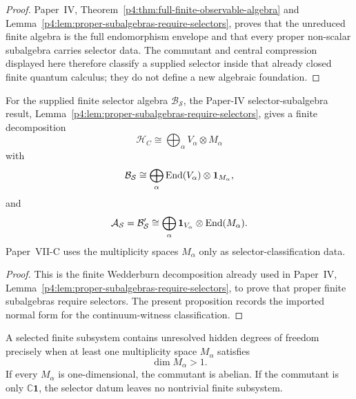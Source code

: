 \documentclass[12pt,a4paper]{article}
\begin{document}
\begin{proof}
Paper~IV, Theorem~\ref{p4:thm:full-finite-observable-algebra} and Lemma~\ref{p4:lem:proper-subalgebras-require-selectors}, proves that the unreduced finite algebra is the full endomorphism
envelope and that every proper non-scalar subalgebra carries selector data.
The commutant and central compression displayed here therefore classify a
supplied selector inside that already closed finite quantum calculus; they do
not define a new algebraic foundation.
\end{proof}

\begin{proposition}
\label{p12:thm:wedderburn-selector-form}
For the supplied finite selector algebra \(\mathcal B_{\mathcal S}\), the
Paper-IV selector-subalgebra result, Lemma~\ref{p4:lem:proper-subalgebras-require-selectors}, gives a finite decomposition
\begin{equation}
\label{p12:eq:wedderburn-carrier-decomposition}
\mathcal H_C\cong\bigoplus_{\alpha}V_\alpha\otimes M_\alpha
\end{equation}
with
\begin{equation}
\label{p12:eq:selector-wedderburn}
\mathcal B_{\mathcal S}\cong
\bigoplus_{\alpha}\operatorname{End}(V_\alpha)\otimes\mathbf1_{M_\alpha},
\end{equation}
and
\begin{equation}
\label{p12:eq:commutant-wedderburn}
\mathcal A_{\mathcal S}=\mathcal B_{\mathcal S}'\cong
\bigoplus_{\alpha}\mathbf1_{V_\alpha}\otimes\operatorname{End}(M_\alpha).
\end{equation}
Paper~VII-C uses the multiplicity spaces \(M_\alpha\) only as selector-classification data.
\end{proposition}

\begin{proof}
This is the finite Wedderburn decomposition already used in Paper~IV, Lemma~\ref{p4:lem:proper-subalgebras-require-selectors}, to prove
that proper finite subalgebras require selectors.  The present proposition
records the imported normal form for the continuum-witness classification.
\end{proof}

\begin{corollary}
\label{p12:cor:hidden-dof-multiplicity}
A selected finite subsystem contains unresolved hidden degrees of freedom precisely when at least one multiplicity space \(M_\alpha\) satisfies
\[
\dim M_\alpha>1.
\]
If every \(M_\alpha\) is one-dimensional, the commutant is abelian.  If the commutant is only \(\mathbb C\mathbf1\), the selector datum leaves no nontrivial finite subsystem.
\end{corollary}
\end{document}

